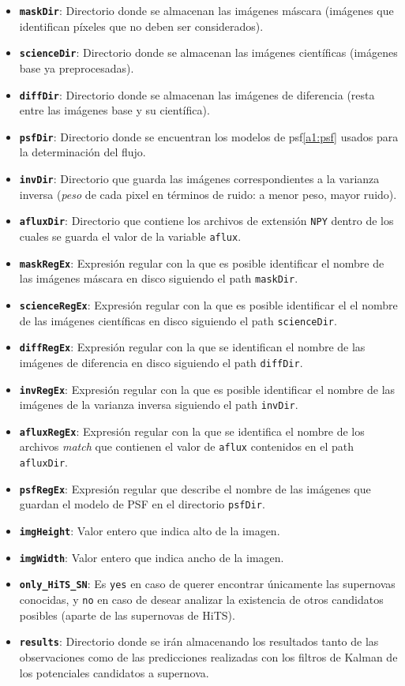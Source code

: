 \begin{itemize}
\item \textbf{\texttt{maskDir}}: Directorio donde se almacenan las im\'agenes m\'ascara (im\'agenes que identifican p\'ixeles que no deben ser considerados).
\item \textbf{\texttt{scienceDir}}: Directorio donde se almacenan las im\'agenes cient\'ificas (im\'agenes base ya preprocesadas).
\item \textbf{\texttt{diffDir}}: Directorio donde se almacenan las im\'agenes de diferencia (resta entre las im\'agenes base y su cient\'ifica).
\item \textbf{\texttt{psfDir}}: Directorio donde se encuentran los modelos de psf\ref{a1:psf} usados para la determinaci\'on del flujo.
\item \textbf{\texttt{invDir}}: Directorio que guarda las im\'agenes correspondientes a la varianza inversa (\textit{peso} de cada pixel en t\'erminos de ruido: a menor peso, mayor ruido).
\item \textbf{\texttt{afluxDir}}: Directorio que contiene los archivos de extensi\'on \texttt{NPY} dentro de los cuales se guarda el valor de la variable \texttt{aflux}.
\item \textbf{\texttt{maskRegEx}}: Expresi\'on regular con la que es posible identificar el nombre de las im\'agenes m\'ascara en disco siguiendo el path \texttt{maskDir}.
\item \textbf{\texttt{scienceRegEx}}: Expresi\'on regular con la que es posible identificar el el nombre de las im\'agenes cient\'ificas en disco siguiendo el path \texttt{scienceDir}.
\item \textbf{\texttt{diffRegEx}}: Expresi\'on regular con la que se identifican el nombre de las im\'agenes de diferencia en disco siguiendo el path \texttt{diffDir}.
\item \textbf{\texttt{invRegEx}}: Expresi\'on regular con la que es posible identificar el nombre de las im\'agenes de la varianza inversa siguiendo el path \texttt{invDir}.
\item \textbf{\texttt{afluxRegEx}}: Expresi\'on regular con la que se identifica el nombre de los archivos \textit{match} que contienen el valor de \texttt{aflux} contenidos en el path \texttt{afluxDir}.
\item \textbf{\texttt{psfRegEx}}: Expresi\'on regular que describe el nombre de las im\'agenes que guardan el modelo de PSF en el directorio \texttt{psfDir}.
\item \textbf{\texttt{imgHeight}}: Valor entero que indica alto de la imagen.
\item \textbf{\texttt{imgWidth}}: Valor entero que indica ancho de la imagen.
\item \textbf{\texttt{only\_HiTS\_SN}}: Es \texttt{yes} en caso de querer encontrar \'unicamente las supernovas conocidas, y \texttt{no} en caso de desear analizar la existencia de otros candidatos posibles (aparte de las supernovas de HiTS). 
\item \textbf{\texttt{results}}: Directorio donde se ir\'an almacenando los resultados tanto de las observaciones como de las predicciones realizadas con los filtros de Kalman de los potenciales candidatos a supernova.
\end{itemize}

